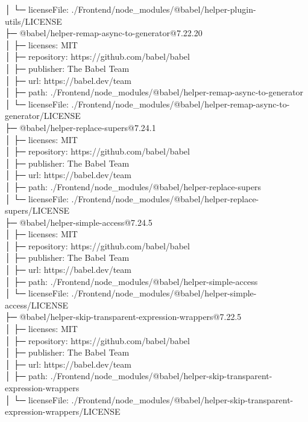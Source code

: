 │  └─ licenseFile: ./Frontend/node\_modules/@babel/helper-plugin-utils/LICENSE\\
├─ @babel/helper-remap-async-to-generator@7.22.20\\
│  ├─ licenses: MIT\\
│  ├─ repository: https://github.com/babel/babel\\
│  ├─ publisher: The Babel Team\\
│  ├─ url: https://babel.dev/team\\
│  ├─ path: ./Frontend/node\_modules/@babel/helper-remap-async-to-generator\\
│  └─ licenseFile: ./Frontend/node\_modules/@babel/helper-remap-async-to-generator/LICENSE\\
├─ @babel/helper-replace-supers@7.24.1\\
│  ├─ licenses: MIT\\
│  ├─ repository: https://github.com/babel/babel\\
│  ├─ publisher: The Babel Team\\
│  ├─ url: https://babel.dev/team\\
│  ├─ path: ./Frontend/node\_modules/@babel/helper-replace-supers\\
│  └─ licenseFile: ./Frontend/node\_modules/@babel/helper-replace-supers/LICENSE\\
├─ @babel/helper-simple-access@7.24.5\\
│  ├─ licenses: MIT\\
│  ├─ repository: https://github.com/babel/babel\\
│  ├─ publisher: The Babel Team\\
│  ├─ url: https://babel.dev/team\\
│  ├─ path: ./Frontend/node\_modules/@babel/helper-simple-access\\
│  └─ licenseFile: ./Frontend/node\_modules/@babel/helper-simple-access/LICENSE\\
├─ @babel/helper-skip-transparent-expression-wrappers@7.22.5\\
│  ├─ licenses: MIT\\
│  ├─ repository: https://github.com/babel/babel\\
│  ├─ publisher: The Babel Team\\
│  ├─ url: https://babel.dev/team\\
│  ├─ path: ./Frontend/node\_modules/@babel/helper-skip-transparent-expression-wrappers\\
│  └─ licenseFile: ./Frontend/node\_modules/@babel/helper-skip-transparent-expression-wrappers/LICENSE\\

